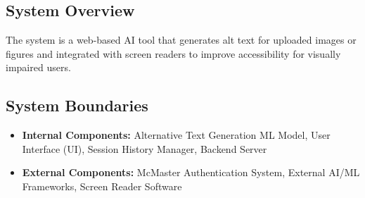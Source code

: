 \documentclass{article}
\begin{document}
\subsection{System Overview}
The system is a web-based AI tool that generates alt text
for uploaded images or figures
and integrated with screen readers to improve accessibility for
visually impaired users.
\subsection{System Boundaries}
\begin{itemize}
    \item \textbf{Internal Components:} Alternative Text Generation ML Model, User Interface (UI), Session History Manager, Backend Server
    \item \textbf{External Components:} McMaster Authentication System, External AI/ML Frameworks, Screen Reader Software
\end{itemize}
\end{document}
